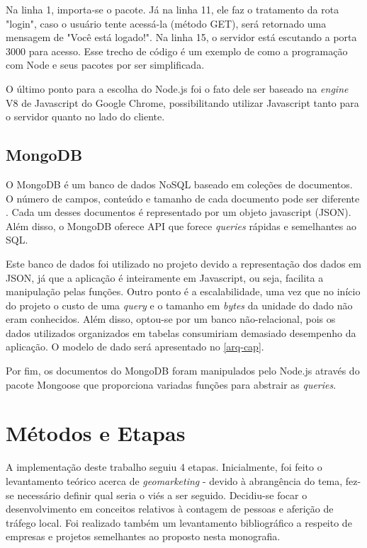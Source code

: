 Na linha 1, importa-se o pacote. Já na linha 11, ele faz o tratamento da rota "login", caso o usuário tente acessá-la (método GET), será retornado uma mensagem de "Você está logado!". Na linha 15, o servidor está escutando a porta 3000 para acesso. Esse trecho de código é um exemplo de como a programação
com Node e seus pacotes por ser simplificada.

O último ponto para a escolha do Node.js foi o fato dele ser baseado na
\emph{engine} V8 de Javascript do Google Chrome, possibilitando utilizar
Javascript tanto para o servidor quanto no lado do cliente.

\subsection{MongoDB}
O MongoDB é um banco de dados NoSQL baseado em coleções de documentos. O número
de campos, conteúdo e tamanho de cada documento pode ser diferente \cite{mongo}.
Cada um desses documentos é representado por um objeto javascript (JSON). Além
disso, o MongoDB oferece API que forece \emph{queries} rápidas e semelhantes ao
SQL.

Este banco de dados foi utilizado no projeto devido a representação dos dados em
JSON, já que a aplicação é inteiramente em Javascript, ou seja, facilita a
manipulação pelas funções. Outro ponto é a escalabilidade, uma vez que no início
do projeto o custo de uma \emph{query} e o tamanho em \emph{bytes} da unidade do
dado não eram conhecidos. Além disso, optou-se por um banco não-relacional, pois os dados utilizados organizados em tabelas consumiriam demasiado desempenho da aplicação. O modelo de dado será apresentado no \autoref{arq-cap}.

Por fim, os documentos do MongoDB foram manipulados pelo Node.js através do pacote Mongoose que proporciona variadas
funções para abstrair as \emph{queries}.

\section{Métodos e Etapas}
\label{metodos-etapas}

A implementação deste trabalho seguiu 4 etapas. Inicialmente, foi feito o levantamento teórico acerca de \emph{geomarketing} - devido à abrangência do tema, fez-se necessário definir
qual seria o viés a ser seguido. Decidiu-se focar o desenvolvimento em conceitos
relativos à contagem de pessoas e aferição de tráfego local. Foi realizado
também um levantamento bibliográfico a respeito de empresas e projetos
semelhantes ao proposto nesta monografia.

